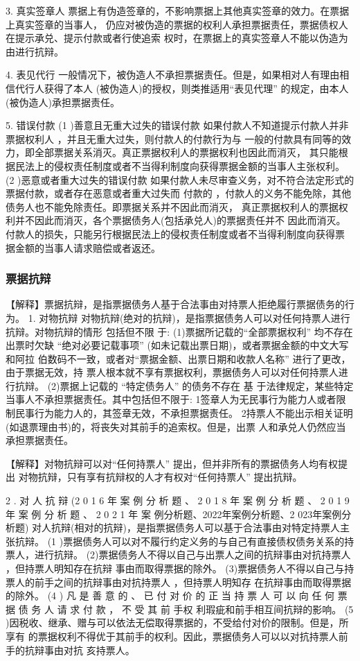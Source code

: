\documentclass[UTF8,12pt]{ctexart}
\numberwithin{equation}{section} %
\numberwithin{figure}{section}
\numberwithin{table}{section}
\begin{document}
	
	3. 真实签章人 票据上有伪造签章的，不影响票据上其他真实签章的效力。在票据上真实签章的当事人， 仍应对被伪造的票据的权利人承担票据责任，票据债权人在提示承兑、提示付款或者行使追索 权时，在票据上的真实签章人不能以伪造为由进行抗辩。
	
	4. 表见代行 一般情况下，被伪造人不承担票据责任。但是，如果相对人有理由相信代行人获得了本人 (被伪造人)的授权，则类推适用“表见代理” 的规定，由本人(被伪造人)承担票据责任。
	
	5. 错误付款
	(1 )善意且无重大过失的错误付款
	如果付款人不知道提示付款人并非票据权利人 ，并且无重大过失，则付款人的付款行为与 一般的付款具有同等的效力，即全部票据关系消灭。真正票据权利人的票据权利也因此而消灭， 其只能根据民法上的侵权责任制度或者不当得利制度向获得票据金额的当事人主张权利。
	(2 )恶意或者重大过失的错误付款 如果付款人未尽审查义务，对不符合法定形式的票据付款，或者存在恶意或者重大过失而 付款的 ，付款人的义务不能免除，其他债务人也不能免除责任。即票据关系并不因此而消灭， 真正票据权利人的票据权利并不因此而消灭，各个票据债务人(包括承兑人)的票据责任并不 因此而消灭。付款人的损失，只能另行根据民法上的侵权责任制度或者不当得利制度向获得票 据金额的当事人请求赔偿或者返还。
	
	\subsubsection{票据抗辩}
	
	【解释】票据抗辩，是指票据债务人基于合法事由对持票人拒绝履行票据债务的行为。
	1. 对物抗辩 对物抗辩(绝对的抗辩)，是指票据债务人可以对任何持票人进行抗辩。对物抗辩的情形 包括但不限 于:
	(1)票据所记载的“全部票据权利” 均不存在
	出票时欠缺 “绝对必要记载事项” (如未记载出票日期)，或者票据金额的中文大写和阿拉 伯数码不一致，或者对“票据金额、出票日期和收款人名称” 进行了更改，由于票据无效，持 票人根本就不享有票据权利，票据债务人可以对任何持票人进行抗辩。
	(2)票据上记载的 “特定债务人” 的债务不存在
	基 于法律规定，某些特定当事人不承担票据责任。其中包括但不限于: 1签章人为无民事行为能力人或者限制民事行为能力人的，其签章无效，不承担票据责任。 2持票人不能出示相关证明(如退票理由书)的，将丧失对其前手的追索权。但是，出票 人和承兑人仍然应当承担票据责任。
	
	
	【解释】对物抗辩可以对“任何持票人” 提出，但并非所有的票据债务人均有权提出 对物抗辩，只有享有抗辩权的人才有权对“任何持票人” 提出抗辩。
	
	2 . 对 人 抗 辩 (2 0 1 6 年 案 例 分 析 题 、 2 0 1 8 年 案 例 分 析 题 、 2 0 1 9 年 案 例 分 析 题 、 2 0 2 1 年 案
	例分析题、2022年案例分析题、2 023年案例分析题)
	对人抗辩(相对的抗辩)，是指票据债务人可以基于合法事由对特定持票人主张抗辩。
	(1 )票据债务人可以对不履行约定义务的与自己有直接债权债务关系的持票人，进行抗辩。
	(2)票据债务人不得以自己与出票人之间的抗辩事由对抗持票人 ，但持票人明知存在抗辩
	事由而取得票据的除外。
	(3)票据债务人不得以自己与持票人的前手之间的抗辩事由对抗持票人 ，但持票人明知存
	在抗辩事由而取得票据的除外。
	(4 ) 凡 是 善 意 的 、 已 付 对 价 的 正 当 持 票 人 可 以 向 任 何 票 据 债 务 人 请 求 付 款 ， 不 受 其 前 手权
	利瑕疵和前手相互间抗辩的影响。
	(5 )因税收、继承、赠与可以依法无偿取得票据的，不受给付对价的限制。但是，所享有
	的票据权利不得优于其前手的权利。因此，票据债务人可以以对抗持票人前手的抗辩事由对抗
	亥持票人。
	
\end{document}
